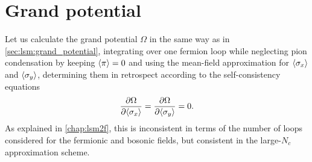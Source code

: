 \section{Grand potential}

Let us calculate the grand potential $\Omega$ in the same way as in \cref{sec:lsm:grand_potential},
integrating over one fermion loop while
neglecting pion condensation by keeping $\langle \pi \rangle=0$
and using the mean-field approximation for $\langle \sigma_x \rangle$ and $\langle \sigma_y \rangle$,
determining them in retrospect according to the self-consistency equations
\begin{equation}
	\pdv{\Omega}{ \langle \sigma_x \rangle} =
	\pdv{\Omega}{ \langle \sigma_y \rangle} = 0.
\end{equation}
As explained in \cref{chap:lsm2f},
this is inconsistent in terms of the number of loops considered for the fermionic and bosonic fields,
but consistent in the large-$N_c$ approximation scheme.

